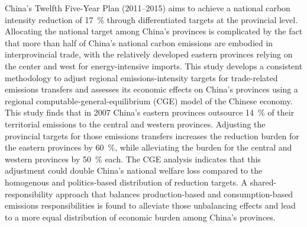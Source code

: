 China's Twelfth Five-Year Plan (2011--2015) aims to achieve a national carbon intensity reduction of 17 {\%} through differentiated targets at the provincial level. Allocating the national target among China's provinces is complicated by the fact that more than half of China's national carbon emissions are embodied in interprovincial trade, with the relatively developed eastern provinces relying on the center and west for energy-intensive imports. This study develops a consistent methodology to adjust regional emissions-intensity targets for trade-related emissions transfers and assesses its economic effects on China's provinces using a regional computable-general-equilibrium (CGE) model of the Chinese economy. This study finds that in 2007 China's eastern provinces outsource 14 {\%} of their territorial emissions to the central and western provinces. Adjusting the provincial targets for those emissions transfers increases the reduction burden for the eastern provinces by 60 {\%}, while alleviating the burden for the central and western provinces by 50 {\%} each. The CGE analysis indicates that this adjustment could double China's national welfare loss compared to the homogenous and politics-based distribution of reduction targets. A shared-responsibility approach that balances production-based and consumption-based emissions responsibilities is found to alleviate those unbalancing effects and lead to a more equal distribution of economic burden among China's provinces.